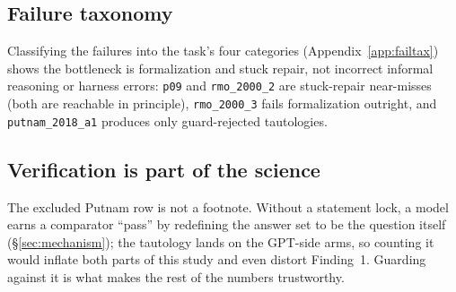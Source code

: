 \subsection{Failure taxonomy}
Classifying the \Sdev{} failures into the task's four categories
(Appendix~\ref{app:failtax}) shows the bottleneck is formalization and stuck
repair, not incorrect informal reasoning or harness errors: \texttt{p09} and
\texttt{rmo\_2000\_2} are stuck-repair near-misses (both are reachable in
principle), \texttt{rmo\_2000\_3} fails formalization outright, and
\texttt{putnam\_2018\_a1} produces only guard-rejected tautologies.

\subsection{Verification is part of the science}
The excluded Putnam row is not a footnote. Without a statement lock, a model earns
a comparator ``pass'' by redefining the answer set to be the question itself
(\S\ref{sec:mechanism}); the tautology lands on the GPT-side arms, so counting it
would inflate both parts of this study and even distort Finding~1. Guarding against
it is what makes the rest of the numbers trustworthy.
